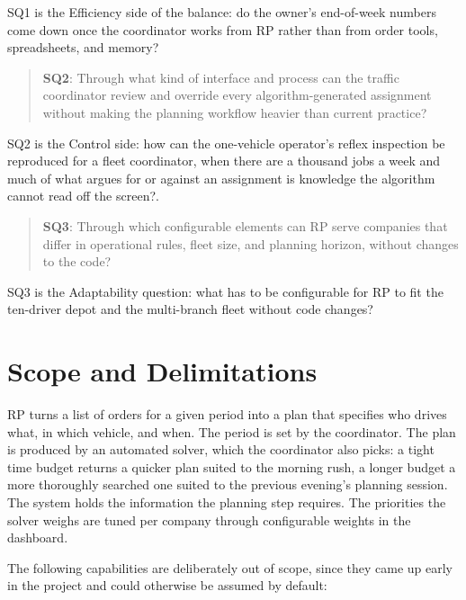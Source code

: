SQ1 is the Efficiency side of the balance: do the owner's end-of-week numbers come down once the coordinator works from RP rather than from order tools, spreadsheets, and memory?

\begin{quote}
  \textbf{SQ2}: Through what kind of interface and process can the traffic coordinator review and override every algorithm-generated assignment without making the planning workflow heavier than current practice?
\end{quote}

SQ2 is the Control side: how can the one-vehicle operator's reflex inspection be reproduced for a fleet coordinator, when there are a thousand jobs a week and much of what argues for or against an assignment is knowledge the algorithm cannot read off the screen?.

\begin{quote}
  \textbf{SQ3}: Through which configurable elements can RP serve companies that differ in operational rules, fleet size, and planning horizon, without changes to the code?
\end{quote}

SQ3 is the Adaptability question: what has to be configurable for RP to fit the ten-driver depot and the multi-branch fleet without code changes?



\section{Scope and Delimitations}
\label{sec:scope}

RP turns a list of orders for a given period into a plan that specifies who drives what, in which vehicle, and when. The period is set by the coordinator. The plan is produced by an automated solver, which the coordinator also picks: a tight time budget returns a quicker plan suited to the morning rush, a longer budget a more thoroughly searched one suited to the previous evening's planning session. The system holds the information the planning step requires. The priorities the solver weighs are tuned per company through configurable weights in the dashboard.

The following capabilities are deliberately out of scope, since they came up early in the project and could otherwise be assumed by default:

